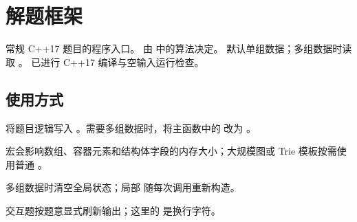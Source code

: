 \section{解题框架}
\label{algo:solution}
\AlgorithmMeta
    {常规 C++17 题目的程序入口。}
    {由  中的算法决定。}
    {默认单组数据；多组数据时读取 。}
    {已进行 C++17 编译与空输入运行检查。}

\subsection*{使用方式}
将题目逻辑写入 。需要多组数据时，将主函数中的  改为 。


\begin{Pitfalls}
    \item {} 宏会影响数组、容器元素和结构体字段的内存大小；大规模图或 Trie 模板按需使用普通 。
    \item 多组数据时清空全局状态；局部  随每次调用重新构造。
    \item 交互题按题意显式刷新输出；这里的  是换行字符。
\end{Pitfalls}
